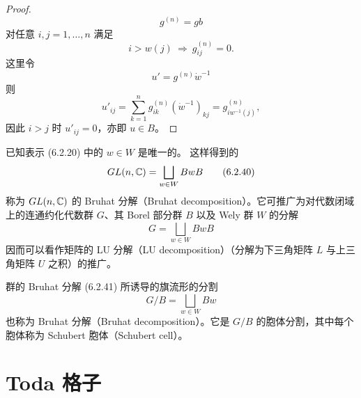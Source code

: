 \begin{proof}
\begin{equation}
  g^{(n)}=gb
  \tag{6.2.36}
\end{equation}
对任意 $i,j=1,\dots,n$ 满足
\begin{equation}
  i>w(j)\ \Longrightarrow\ g^{(n)}_{ij}=0.
  \tag{6.2.37}
\end{equation}
这里令
\begin{equation}
  u'=g^{(n)}\dot{w}^{-1}
  \tag{6.2.38}
\end{equation}
则
\begin{equation}
  u'_{ij}=\sum_{k=1}^{n}g^{(n)}_{ik}(\dot{w}^{-1})_{kj}=g^{(n)}_{iw^{-1}(j)},
  \tag{6.2.39}
\end{equation}
因此 $i>j$ 时 $u'_{ij}=0$，亦即 $u\in B$。
\end{proof}

已知表示 (6.2.20) 中的 $w\in W$ 是唯一的。
这样得到的
\begin{equation}
  GL(n,\mathbb{C})=\bigsqcup_{w\in W}BwB
  \tag{6.2.40}
\end{equation}
称为 $GL(n,\mathbb{C})$ 的 Bruhat 分解（Bruhat decomposition）。它可推广为对代数闭域上的连通约化代数群 $G$、其 Borel 部分群 $B$ 以及 Wely 群 $W$ 的分解
\begin{equation}
  G=\bigsqcup_{w\in W}BwB
  \tag{6.2.41}
\end{equation}
因而可以看作矩阵的 LU 分解（LU decomposition）（分解为下三角矩阵 $L$ 与上三角矩阵 $U$ 之积）的推广。

群的 Bruhat 分解 (6.2.41) 所诱导的旗流形的分割
\begin{equation}
  G/B=\bigsqcup_{w\in W}Bw
  \tag{6.2.42}
\end{equation}
也称为 Bruhat 分解（Bruhat decomposition）。它是 $G/B$ 的胞体分割，其中每个胞体称为 Schubert 胞体（Schubert cell）。

\section{Toda 格子}

